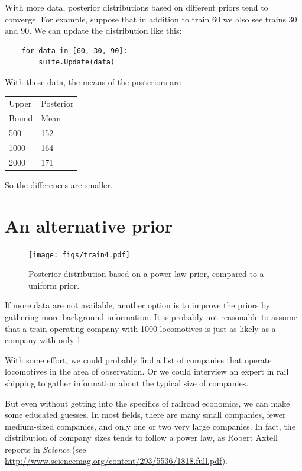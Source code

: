 \documentclass[12pt]{book}
\begin{document}
With more data, posterior distributions based on different
priors tend to converge.  For example, suppose that in addition
to train 60 we also see trains 30 and 90.  We can update the
distribution like this:

\begin{verbatim}
    for data in [60, 30, 90]:
        suite.Update(data)
\end{verbatim}

With these data, the means of the posteriors are

  \begin{tabular}{|l|l|}
  \hline
  Upper & Posterior \\
  Bound & Mean \\
  \hline
  500 & 152 \\
  1000 & 164\\
  2000 & 171\\
  \hline
  \end{tabular}

So the differences are smaller.


\section{An alternative prior}

\begin{figure}
\centerline{\texttt{[image: figs/train4.pdf]}}
\caption{Posterior distribution based on a power law prior,
compared to a uniform prior.}
\label{fig.train4}
\end{figure}

If more data are not available, another option is to improve the
priors by gathering more background information.  It is probably
not reasonable to assume that a train-operating company with 1000 locomotives
is just as likely as a company with only 1.

With some effort, we could probably find a list of companies that
operate locomotives in the area of observation.  Or we could
interview an expert in rail shipping to gather information about
the typical size of companies.

But even without getting into the specifics of railroad economics, we
can make some educated guesses.  In most fields, there are many small
companies, fewer medium-sized companies, and only one or two very
large companies.  In fact, the distribution of company sizes tends to
follow a power law, as Robert Axtell reports in {\it Science} (see
\url{http://www.sciencemag.org/content/293/5536/1818.full.pdf}).
\end{document}
